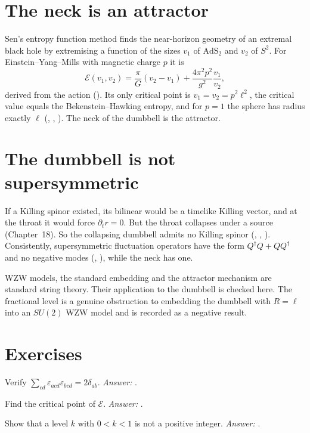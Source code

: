 \section{The neck is an attractor}

Sen's entropy function method finds the near-horizon geometry of an extremal black hole by extremising a function of the sizes $v_1$ of $\mathrm{AdS}_2$ and $v_2$ of $S^2$. For Einstein--Yang--Mills with magnetic charge $p$ it is
\[
\mathcal E(v_1,v_2)=\frac\pi G(v_2-v_1)+\frac{4\pi^2p^2}{g^2}\frac{v_1}{v_2},
\]
derived from the action (). Its only critical point is $v_1=v_2=p^2\ell^2$, the critical value equals the Bekenstein--Hawking entropy, and for $p=1$ the sphere has radius exactly $\ell$ (, , ). The neck of the dumbbell is the attractor.

\section{The dumbbell is not supersymmetric}

If a Killing spinor existed, its bilinear would be a timelike Killing vector, and at the throat it would force $\partial_tr=0$. But the throat collapses under a source (Chapter~18). So the collapsing dumbbell admits no Killing spinor (, , ). Consistently, supersymmetric fluctuation operators have the form $Q^\dagger Q+QQ^\dagger$ and no negative modes (, ), while the neck has one.

\begin{standsbox}
WZW models, the standard embedding and the attractor mechanism are standard string theory. Their application to the dumbbell is checked here. The fractional level is a genuine obstruction to embedding the dumbbell with $R=\ell$ into an $SU(2)$ WZW model and is recorded as a negative result.
\end{standsbox}

\section*{Exercises}
\begin{exercise}Verify $\sum_{cd}\varepsilon_{acd}\varepsilon_{bcd}=2\delta_{ab}$. \emph{Answer:} .\end{exercise}
\begin{exercise}Find the critical point of $\mathcal E$. \emph{Answer:} .\end{exercise}
\begin{exercise}Show that a level $k$ with $0<k<1$ is not a positive integer. \emph{Answer:} .\end{exercise}
